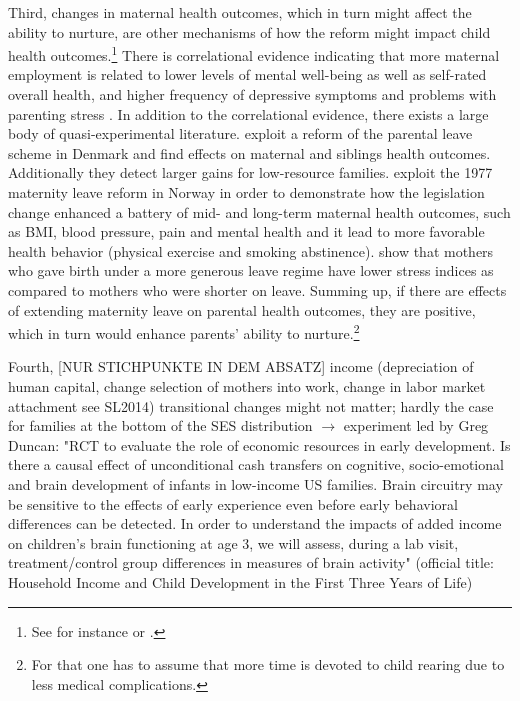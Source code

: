\documentclass[11pt, a4paper,draft]{article} %
\begin{document}
Third, changes in maternal health outcomes, which in turn might affect the ability to nurture, are other mechanisms of how the reform might impact child health outcomes.\footnote{See for instance \cite{patel2004} or \cite{frech2011maternal}.} There is correlational evidence indicating that more maternal employment is related to lower levels of mental well-being as well as self-rated overall health, and higher frequency of depressive symptoms and problems with parenting stress \citep{chatterji2005does,Chatterji2013}. In addition to the correlational evidence, there exists a large body of quasi-experimental literature. \cite{beuchert2016} exploit a reform of the parental leave scheme in Denmark and find effects on maternal and siblings health outcomes. Additionally they detect larger gains for low-resource families. \cite{butikofer2018impact} exploit the 1977 maternity leave reform in Norway in order to demonstrate how the legislation change enhanced a battery of mid- and long-term maternal health outcomes, such as BMI, blood pressure, pain and mental health and it lead to more favorable health behavior (physical exercise and smoking abstinence). \cite{albagli2018} show that mothers who gave birth under a more generous leave regime have lower stress indices as compared to mothers who were shorter on leave. \newline 
Summing up, if there are effects of extending maternity leave on parental health outcomes, they are positive, which in turn would enhance parents' ability to nurture.\footnote{ For that one has to assume that more time is devoted to child rearing due to less medical complications.}\newline 



Fourth,  [NUR STICHPUNKTE IN DEM ABSATZ]
 income (depreciation of human capital, change selection of mothers into work, change in labor market attachment see SL2014)
transitional changes might not matter; hardly the case for families at the bottom of the SES distribution $\rightarrow$	 
experiment led by Greg Duncan: "RCT to evaluate the role of economic resources in early development. Is there a causal effect of unconditional cash transfers on cognitive, socio-emotional and brain development of infants in low-income US families. Brain circuitry may be sensitive to the effects of early experience even before early behavioral differences can be detected. In order to understand the impacts of added income on children's brain functioning at age 3, we will assess, during a lab visit, treatment/control group differences in measures of brain activity" (official title: Household Income and Child Development in the First Three Years of Life)
\end{document}
